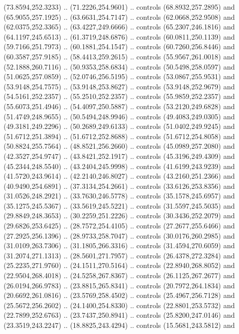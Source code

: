 \begin{scope}[cm={{1.25,0.0,0.0,-1.25,(0.0,743.43331)}}]
    (73.8594,252.3233) .. (71.2226,254.9601) .. controls (68.8932,257.2895) and
    (65.9055,257.1925) .. (63.6631,254.7147) .. controls (62.0668,252.9508) and
    (62.0375,252.3365) .. (63.4227,249.6666) .. controls (65.2307,246.1816) and
    (64.1197,245.6513) .. (61.3719,248.6876) .. controls (60.0811,250.1139) and
    (59.7166,251.7973) .. (60.1881,254.1547) .. controls (60.7260,256.8446) and
    (60.3587,257.9185) .. (58.4413,259.2615) .. controls (55.9567,261.0018) and
    (52.1888,260.7116) .. (50.9353,258.6834) .. controls (50.5498,258.0597) and
    (51.0625,257.0859) .. (52.0746,256.5195) .. controls (53.0867,255.9531) and
    (53.9148,254.7575) .. (53.9148,253.8627) .. controls (53.9148,252.9679) and
    (54.5161,252.2357) .. (55.2510,252.2357) .. controls (55.9859,252.2357) and
    (55.6073,251.4946) .. (54.4097,250.5887) .. controls (53.2120,249.6828) and
    (51.4749,248.9655) .. (50.5494,248.9946) .. controls (49.4083,249.0305) and
    (49.3181,249.2296) .. (50.2689,249.6133) .. controls (51.0402,249.9245) and
    (51.6712,251.3894) .. (51.6712,252.8688) .. controls (51.6712,254.8058) and
    (50.8824,255.7564) .. (48.8521,256.2660) .. controls (45.0989,257.2080) and
    (42.3527,254.9747) .. (43.8421,252.1917) .. controls (45.3196,249.4309) and
    (45.2344,248.5540) .. (43.2404,245.9998) .. controls (41.6199,243.9239) and
    (41.5720,243.9614) .. (42.2140,246.8027) .. controls (43.2160,251.2366) and
    (40.9490,254.6891) .. (37.3134,254.2661) .. controls (33.6126,253.8356) and
    (31.0526,248.2921) .. (33.7630,246.5778) .. controls (35.1578,245.6957) and
    (35.1275,245.5367) .. (33.5619,245.5221) .. controls (31.5597,245.5035) and
    (29.8849,248.3653) .. (30.2259,251.2226) .. controls (30.3436,252.2079) and
    (29.6826,253.6425) .. (28.7572,254.4105) .. controls (27.2677,255.6466) and
    (27.2925,256.1396) .. (28.9733,258.7047) .. controls (30.0176,260.2985) and
    (31.0109,263.7306) .. (31.1805,266.3316) .. controls (31.4594,270.6059) and
    (31.2074,271.1313) .. (28.5601,271.7957) .. controls (26.4378,272.3284) and
    (25.2235,271.9760) .. (24.1511,270.5164) .. controls (22.8940,268.8052) and
    (22.9504,268.4018) .. (24.5258,267.8367) .. controls (26.1125,267.2677) and
    (26.0194,266.9783) .. (23.8815,265.8341) .. controls (20.7972,264.1834) and
    (20.6692,261.0816) .. (23.5769,258.4502) .. controls (25.4967,256.7128) and
    (25.5672,256.2602) .. (24.1400,254.8330) .. controls (22.8801,253.5732) and
    (22.7899,252.6763) .. (23.7437,250.8941) .. controls (25.8200,247.0146) and
    (23.3519,243.2247) .. (18.8825,243.4294) .. controls (15.5681,243.5812) and

\end{scope}
